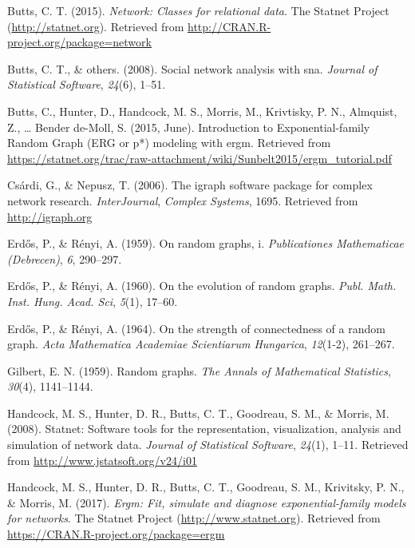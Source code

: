 \documentclass[12pt,twoside]{amherstthesis}
\begin{document}
  \hypertarget{ref-networkpackagemanual}{}
  Butts, C. T. (2015). \emph{Network: Classes for relational data}. The
  Statnet Project (\url{http://statnet.org}). Retrieved from
  \url{http://CRAN.R-project.org/package=network}
  
  \hypertarget{ref-butts2008social}{}
  Butts, C. T., \& others. (2008). Social network analysis with sna.
  \emph{Journal of Statistical Software}, \emph{24}(6), 1--51.
  
  \hypertarget{ref-butts_introduction_2015}{}
  Butts, C., Hunter, D., Handcock, M. S., Morris, M., Krivtisky, P. N.,
  Almquist, Z., \ldots{} Bender de-Moll, S. (2015, June). Introduction to
  Exponential-family Random Graph (ERG or p*) modeling with ergm.
  Retrieved from
  \url{https://statnet.org/trac/raw-attachment/wiki/Sunbelt2015/ergm_tutorial.pdf}
  
  \hypertarget{ref-igraphpackage}{}
  Csárdi, G., \& Nepusz, T. (2006). The igraph software package for
  complex network research. \emph{InterJournal}, \emph{Complex Systems},
  1695. Retrieved from \url{http://igraph.org}
  
  \hypertarget{ref-erdos1959random}{}
  Erd\H{o}s, P., \& Rényi, A. (1959). On random graphs, i.
  \emph{Publicationes Mathematicae (Debrecen)}, \emph{6}, 290--297.
  
  \hypertarget{ref-erdos1960evolution}{}
  Erd\H{o}s, P., \& Rényi, A. (1960). On the evolution of random graphs.
  \emph{Publ. Math. Inst. Hung. Acad. Sci}, \emph{5}(1), 17--60.
  
  \hypertarget{ref-erdHos1964strength}{}
  Erd\H{o}s, P., \& Rényi, A. (1964). On the strength of connectedness of
  a random graph. \emph{Acta Mathematica Academiae Scientiarum Hungarica},
  \emph{12}(1-2), 261--267.
  
  \hypertarget{ref-gilbert1959random}{}
  Gilbert, E. N. (1959). Random graphs. \emph{The Annals of Mathematical
  Statistics}, \emph{30}(4), 1141--1144.
  
  \hypertarget{ref-statnetpackagearticle}{}
  Handcock, M. S., Hunter, D. R., Butts, C. T., Goodreau, S. M., \&
  Morris, M. (2008). Statnet: Software tools for the representation,
  visualization, analysis and simulation of network data. \emph{Journal of
  Statistical Software}, \emph{24}(1), 1--11. Retrieved from
  \url{http://www.jstatsoft.org/v24/i01}
  
  \hypertarget{ref-ergmpackagemanual}{}
  Handcock, M. S., Hunter, D. R., Butts, C. T., Goodreau, S. M.,
  Krivitsky, P. N., \& Morris, M. (2017). \emph{Ergm: Fit, simulate and
  diagnose exponential-family models for networks}. The Statnet Project
  (\url{http://www.statnet.org}). Retrieved from
  \url{https://CRAN.R-project.org/package=ergm}
  
\end{document}

